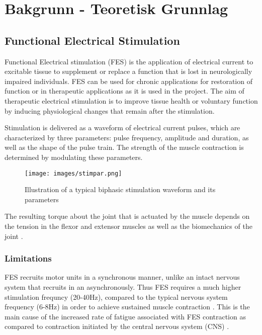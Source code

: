 
\section{Bakgrunn - Teoretisk Grunnlag}



\subsection{Functional Electrical Stimulation}
Functional Electrical stimulation (FES) is the application of electrical current to excitable tissue to supplement or replace a function that is lost in neurologically impaired individuals. FES can be used for chronic applications for restoration of function or in therapeutic applications as it is used in the project. The aim of therapeutic electrical stimulation is to improve tissue health or voluntary function by inducing physiological changes that remain after the stimulation. 

Stimulation is delivered as a waveform of electrical current pulses, which are characterized by three parameters: pulse frequency, amplitude and duration, as well as the shape of the pulse train. The strength of the muscle contraction is determined by modulating these parameters.

\begin{figure} [H]
    \centering
    \texttt{[image: images/stimpar.png]}
    \caption{Illustration of a typical biphasic stimulation waveform and its parameters \cite{marquez-chin_functional_2020}}
    \label{fig:waveforms}
\end{figure}

The resulting torque about the joint that is actuated by the muscle depends on the tension in the flexor and extensor muscles as well as the biomechanics of the joint \cite{lynch_functional_2008}. 

\subsubsection{Limitations}
FES recruits motor units in a synchronous manner, unlike an intact nervous system that recruits in an asynchronously. Thus FES requires a much higher stimulation frequncy (20-40Hz), compared to the typical nervous system frequency (6-8Hz) in order to achieve sustained muscle contraction \cite{lynch_functional_2008}. This is the main cause of the increased rate of fatigue associated with FES contraction as compared to contraction initiated by the central nervous system (CNS) \cite{gilman_handbook_1983}. 

